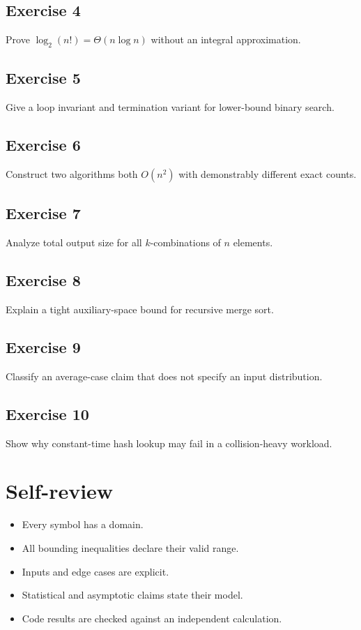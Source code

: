 \documentclass[11pt,letterpaper]{article}
\begin{document}
\subsection{Exercise 4}\noindent Prove $\log_2(n!)=\Theta(n\log n)$ without an integral approximation.
\subsection{Exercise 5}\noindent Give a loop invariant and termination variant for lower-bound binary search.
\subsection{Exercise 6}\noindent Construct two algorithms both $O(n^2)$ with demonstrably different exact counts.
\subsection{Exercise 7}\noindent Analyze total output size for all $k$-combinations of $n$ elements.
\subsection{Exercise 8}\noindent Explain a tight auxiliary-space bound for recursive merge sort.
\subsection{Exercise 9}\noindent Classify an average-case claim that does not specify an input distribution.
\subsection{Exercise 10}\noindent Show why constant-time hash lookup may fail in a collision-heavy workload.
\section{Self-review}
\begin{itemize}\item Every symbol has a domain.\item All bounding inequalities declare their valid range.\item Inputs and edge cases are explicit.\item Statistical and asymptotic claims state their model.\item Code results are checked against an independent calculation.\end{itemize}
\end{document}
